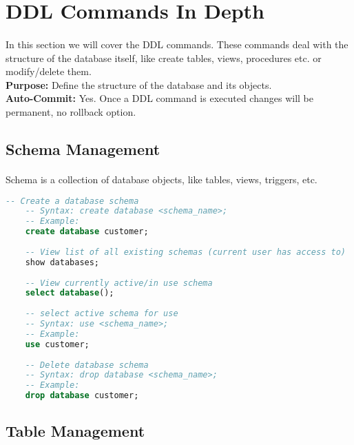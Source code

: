 
\section{\acs{DDL} Commands In Depth}
\paragraph{} In this section we will cover the \acf{DDL} commands. These commands deal with the structure of the database itself, like create tables, views, procedures etc. or modify/delete them.\\\textbf{Purpose:} Define the structure of the database and its objects.\\\textbf{Auto-Commit:} Yes. Once a \acs{DDL} command is executed changes will be permanent, no rollback option.
\subsection{Schema Management}
\paragraph{} Schema is a collection of database objects, like tables, views, triggers, etc.
\begin{lstlisting}[language=SQL]
	-- Create a database schema
	-- Syntax: create database <schema_name>;
	-- Example:
	create database customer;
	
	-- View list of all existing schemas (current user has access to)
	show databases;
	
	-- View currently active/in use schema
	select database();
	
	-- select active schema for use
	-- Syntax: use <schema_name>;
	-- Example:
	use customer;
	
	-- Delete database schema
	-- Syntax: drop database <schema_name>;
	-- Example:
	drop database customer;
\end{lstlisting}
\subsection{Table Management}
